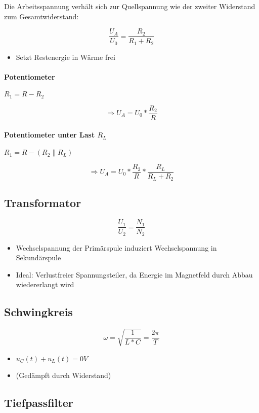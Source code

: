 Die Arbeitsspannung verhält sich zur Quellspannung wie der zweiter Widerstand zum Gesamtwiderstand:

$$\frac{U_A}{U_0} = \frac{R_2}{R_1 + R_2}$$

\begin{itemize}
  \item Setzt Restenergie in Wärme frei
\end{itemize}

\paragraph{Potentiometer} $R_1 = R - R_2$

$$\Rightarrow U_A = U_0 * \frac{R_2}{R}$$

\paragraph{Potentiometer unter Last $R_L$}
$R_1 = R - (R_2 \parallel R_L)$

$$\Rightarrow U_A = U_0 * \frac{R_2}{R} * \frac{R_L}{R_L + R_2}$$

\subsection{Transformator}

$$\frac{U_1}{U_2} = \frac{N_1}{N_2}$$

\begin{itemize}
  \item Wechselspannung der Primärspule induziert Wechselspannung in Sekundärspule
  \item Ideal: Verlustfreier Spannungsteiler, da Energie im Magnetfeld durch Abbau wiedererlangt wird
\end{itemize}

\subsection{Schwingkreis}

$$\omega = \sqrt{\frac{1}{L * C}} = \frac{2\pi}{T}$$

\begin{itemize}
  \item $u_C(t) + u_L(t) = 0V$
  \item (Gedämpft durch Widerstand)
\end{itemize}

\subsection{Tiefpassfilter}

